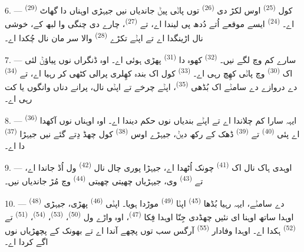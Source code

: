 6. ---  \textsuperscript{(29)} کول  \textsuperscript{(25)}
اوس لکڑ دی  \textsuperscript{(26)} توں پاݨی پیݨ جاندیاں نیں جیہڑی
اوہناں دا گھاٹ اے۔  \textsuperscript{(24)} ایسے موقعے اُتے دُدھ پی
لیندا اے، تے  \textsuperscript{(27)}، چارے دی چنگی وا لبھ کے، خوشی نال
اڑینگدا اے تے اپݨے تکڑے  \textsuperscript{(28)} والا سر مان نال
چُکدا اے۔

7. --- سارے کم وچ لگے نیں۔  \textsuperscript{(32)} کھوہ دا
 \textsuperscript{(31)} پھڑی ہوئی اے۔ اوہ ڈنگراں نوں پیاؤݨ لئی اک
 \textsuperscript{(30)} وچ پاݨی کھِچ رہی اے۔ 
\textsuperscript{(33)} کول اک بندہ کھِلری پرالی کٹھی کر رہیا اے، تے
 \textsuperscript{(34)} دے دروازے دے سامݨے اک بُڈھی
 \textsuperscript{(35)}، اپݨے چرخے تے اپݨی  نال،
پرانے دناں وانگوں  یا  کت رہی اے۔

\VUsaut{3.0mm}
\VUsaut{3.0mm}

8. ---  \textsuperscript{(36)} ایہہ سارا کم چلاندا اے تے اپݨے
بندیاں نوں حکم دیندا اے۔ اوہ اوہناں نوں آکھدا اے پئی 
\textsuperscript{(40)} تے  \textsuperscript{(39)} ڈھک کے رکھ دیݨ، جیہڑے
اوس  \textsuperscript{(38)} کول چھڈ دِتے گئے نیں جیہڑا 
\textsuperscript{(37)} دا اے۔

9. --- اوہدی ہاک نال اک  \textsuperscript{(41)} چونک اُٹھدا اے، جیہڑا
پوری چال نال  \textsuperscript{(42)} ول اُڈ جاندا اے، تے
 \textsuperscript{(43)} وی، جیہڑیاں چھیتی چھیتی 
\textsuperscript{(44)} وچ مُڑ جاندیاں نیں۔

10. ---  \textsuperscript{(48)} دے سامݨے، ایہہ رہیا بُڈھا
 \textsuperscript{(45)} اپݨا  \textsuperscript{(49)}
موڑدا ہویا۔ اپݨی  \textsuperscript{(46)} پھڑی، جیہڑی اوہدا ساتھ اوہنا
ای نئیں چھڈدی جِنّا اوہدا فِکا  \textsuperscript{(47)}، اوہ واڑے ول
 \textsuperscript{(50)}،  \textsuperscript{(53)}،
 \textsuperscript{(54)}،  \textsuperscript{(51)} تے
 \textsuperscript{(52)} ہکدا اے۔ اوہدا وفادار 
\textsuperscript{(55)} آرگس سب توں پچھے آندا اے تے بھونک کے پچھڑیاں نوں اگے کردا اے۔

